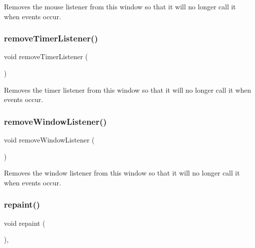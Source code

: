 Removes the mouse listener from this window so that it will no longer call it when events occur. 

\mbox{\label{classGWindow_a8ca9bf0f8dfd3755d73d07ee01e3455f}} 
\subsubsection{\texorpdfstring{remove\+Timer\+Listener()}{removeTimerListener()}}
{\footnotesize\ttfamily void remove\+Timer\+Listener (\begin{DoxyParamCaption}{ }\end{DoxyParamCaption})\hspace{0.3cm}{\ttfamily [virtual]}}



Removes the timer listener from this window so that it will no longer call it when events occur. 

\mbox{\label{classGWindow_ab1ea252520cc160b329cfb5b038add83}} 
\subsubsection{\texorpdfstring{remove\+Window\+Listener()}{removeWindowListener()}}
{\footnotesize\ttfamily void remove\+Window\+Listener (\begin{DoxyParamCaption}{ }\end{DoxyParamCaption})\hspace{0.3cm}{\ttfamily [virtual]}}



Removes the window listener from this window so that it will no longer call it when events occur. 

\mbox{\label{classGForwardDrawingSurface_ab93427f61c64e3db7f2637519aed1c00}} 
\subsubsection{\texorpdfstring{repaint()}{repaint()}}
{\footnotesize\ttfamily void repaint (\begin{DoxyParamCaption}{ }\end{DoxyParamCaption})\hspace{0.3cm}{\ttfamily [virtual]}, {\ttfamily [inherited]}}

